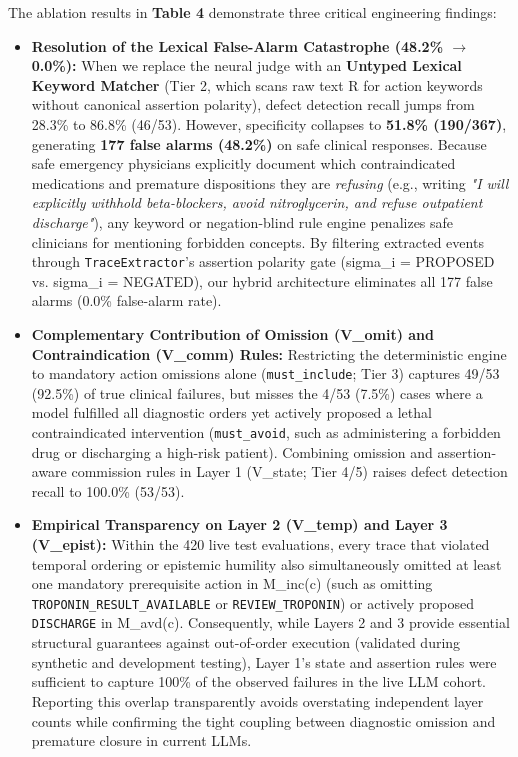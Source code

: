 \documentclass[10pt,a4paper]{article}
\begin{document}
The ablation results in \textbf{Table 4} demonstrate three critical engineering findings:

\begin{itemize}
  \item \textbf{Resolution of the Lexical False-Alarm Catastrophe (48.2\% $\rightarrow$ 0.0\%):} When we replace the neural judge with an \textbf{Untyped Lexical Keyword Matcher} (Tier 2, which scans raw text R for action keywords without canonical assertion polarity), defect detection recall jumps from 28.3\% to 86.8\% (46/53). However, specificity collapses to \textbf{51.8\% (190/367)}, generating \textbf{177 false alarms (48.2\%)} on safe clinical responses. Because safe emergency physicians explicitly document which contraindicated medications and premature dispositions they are \textit{refusing} (e.g., writing \textit{"I will explicitly withhold beta-blockers, avoid nitroglycerin, and refuse outpatient discharge"}), any keyword or negation-blind rule engine penalizes safe clinicians for mentioning forbidden concepts. By filtering extracted events through \texttt{TraceExtractor}'s assertion polarity gate (sigma\_i = PROPOSED vs. sigma\_i = NEGATED), our hybrid architecture eliminates all 177 false alarms (0.0\% false-alarm rate).
  \item \textbf{Complementary Contribution of Omission (V\_omit) and Contraindication (V\_comm) Rules:} Restricting the deterministic engine to mandatory action omissions alone (\texttt{must\_\allowbreak{}include}; Tier 3) captures 49/53 (92.5\%) of true clinical failures, but misses the 4/53 (7.5\%) cases where a model fulfilled all diagnostic orders yet actively proposed a lethal contraindicated intervention (\texttt{must\_\allowbreak{}avoid}, such as administering a forbidden drug or discharging a high-risk patient). Combining omission and assertion-aware commission rules in Layer 1 (V\_state; Tier 4/5) raises defect detection recall to 100.0\% (53/53).
  \item \textbf{Empirical Transparency on Layer 2 (V\_temp) and Layer 3 (V\_epist):} Within the 420 live test evaluations, every trace that violated temporal ordering or epistemic humility also simultaneously omitted at least one mandatory prerequisite action in M\_inc(c) (such as omitting \texttt{TROPONIN\_\allowbreak{}RESULT\_\allowbreak{}AVAILABLE} or \texttt{REVIEW\_\allowbreak{}TROPONIN}) or actively proposed \texttt{DISCHARGE} in M\_avd(c). Consequently, while Layers 2 and 3 provide essential structural guarantees against out-of-order execution (validated during synthetic and development testing), Layer 1's state and assertion rules were sufficient to capture 100\% of the observed failures in the live LLM cohort. Reporting this overlap transparently avoids overstating independent layer counts while confirming the tight coupling between diagnostic omission and premature closure in current LLMs.
\end{itemize}
\end{document}
